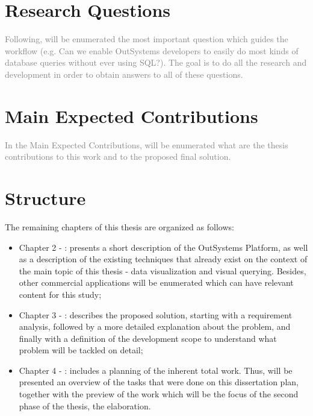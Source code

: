 \section{Research Questions}
\label{sec:research_questions}
\textcolor{gray}{Following, will be enumerated the most important question which guides the workflow (e.g. Can we enable OutSystems developers to easily do most kinds of database queries without ever using SQL?). The goal is to do all the research and development in order to obtain answers to all of these questions.}

\section{Main Expected Contributions}
\label{sec:main_exp_contributions}
\textcolor{gray}{In the Main Expected Contributions, will be enumerated what are the thesis contributions to this work and to the proposed final solution.}

\section{Structure}
\label{sec:structure}

The remaining chapters of this thesis are organized as follows:

\begin{itemize}
  \item Chapter 2 - : presents a short description of the OutSystems Platform, as well as a description of the existing techniques that already exist on the context of the main topic of this thesis - data visualization and visual querying. Besides, other commercial applications will be enumerated which can have relevant content for this study;
  \item Chapter 3 - : describes the proposed solution, starting with a requirement analysis, followed by a more detailed explanation about the problem, and finally with a definition of the development scope to understand what problem will be tackled on detail;
  \item Chapter 4 - : includes a planning of the inherent total work. Thus, will be presented an overview of the tasks that were done on this dissertation plan, together with the preview of the work which will be the focus of the second phase of the thesis, the elaboration.
\end{itemize}
